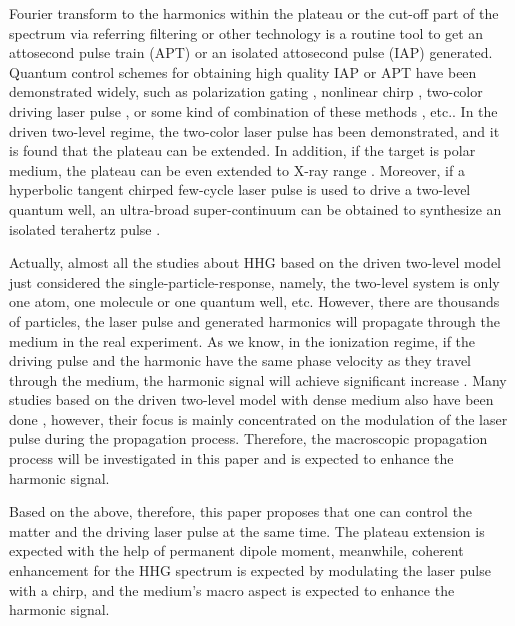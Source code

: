 \documentclass[10pt,letterpaper]{article}
\begin{document}
Fourier transform to the harmonics within the plateau or the cut-off part of the spectrum via  referring filtering or other technology is a routine tool to get an attosecond pulse train (APT) or an isolated attosecond pulse (IAP) generated. Quantum control schemes for obtaining high quality IAP or APT have been demonstrated widely, such as polarization gating \cite{Corkum-PRL-1993,Sansone-Polarization-gate-Nature-2006}, nonlinear chirp \cite{Carrera-Chirp-PRA-2007}, two-color driving laser pulse \cite{ZengZhinan-Two-Color-PRL-2007}, or some kind of combination of these methods \cite{ChangZenghu-Combination-PRA-2007}, etc.. In the driven two-level regime, the two-color laser pulse \cite{Gong-Two-Level-Two-Color-JMO-1999,WANG-ZHONG-YANG-Two-Level-Attosecond-generation-1999,LiuChengpu-Two-Level-PRA-2004} has been demonstrated, and it is found that the plateau can be extended. In addition, if the target is polar medium, the plateau can be even extended to X-ray range \cite{YangWeifeng-Two-Level-PLA-2007}. Moreover, if a hyperbolic tangent chirped few-cycle laser pulse is used to drive a two-level quantum well, an ultra-broad super-continuum can be obtained to synthesize an isolated terahertz pulse \cite{CuiNi2010NJP-wavelet}. 

Actually, almost all the studies about HHG based on the driven two-level model just considered the single-particle-response, namely, the two-level system is only one atom, one molecule or one quantum well, etc. However, there are thousands of particles, the laser pulse and generated harmonics will propagate through the medium in the real experiment. As we know, in the ionization regime, if the driving pulse and the harmonic have the same phase velocity as they travel through the medium, the harmonic signal will achieve significant increase \cite{2009Review}. Many studies based on the driven two-level model with dense medium also have been done \cite{Kalosha-Two-Level-PRL-1999,Xiao-Jian-PRA-2002,Xia-Keyu-OE-2005,Pan-Ruiqin-Permanent-dipole-moment-2011,Ziolkowski-Two-Level-Method-PRA-1995}, however, their focus is mainly concentrated on the modulation of the laser pulse during the propagation process. Therefore, the macroscopic propagation process will be investigated in this paper and is expected to enhance the harmonic signal. 

Based on the above, therefore, this paper proposes that one can control the matter and the driving laser pulse at the same time. The plateau extension is expected with the help of permanent dipole moment, meanwhile, coherent enhancement for the HHG spectrum is expected by modulating the laser pulse with a chirp, and the medium's macro aspect is expected to enhance the harmonic signal.
\end{document}
